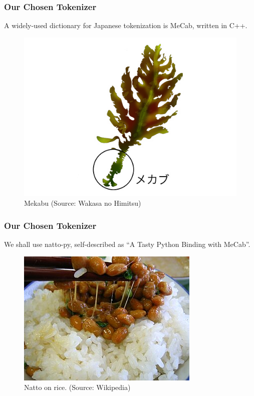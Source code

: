 \documentclass[11pt]{beamer}
\begin{document}
	\begin{frame}
		\frametitle{Our Chosen Tokenizer}
		A widely-used dictionary for Japanese tokenization is MeCab, written in C++.\\
		\pause
		\begin{figure}
			\begin{center}
				\includegraphics[scale=0.2]{mekabu}
			\end{center}
			\caption{Mekabu (Source: Wakasa no Himitsu)}
		\end{figure}
	\end{frame}
	
	\begin{frame}
		\frametitle{Our Chosen Tokenizer}
		We shall use natto-py, self-described as ``A Tasty Python Binding with MeCab''.\\
		\pause
		\begin{figure}
			\begin{center}
				\includegraphics[scale=0.3]{natto_on_rice}
			\end{center}
			\caption{Natto on rice. (Source: Wikipedia)}
		\end{figure}
	\end{frame}
	
\end{document}
